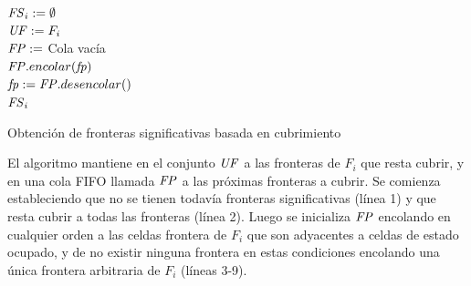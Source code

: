 \begin{algorithm}[H]
\SetAlgoLined

  $\mathit{FS}_i := \emptyset$\\
  $\mathit{UF} := F_i$ \\

  $\mathit{FP} :=$ Cola vacía \\
   {
    $\mathit{FP}.encolar(\mathit{fp})$\\
  }
   {
    $\mathit{fp} := \mathit{FP}.desencolar()$\\
  }
  \Return $\mathit{FS}_i$ 

  \caption{Obtención de fronteras significativas basada en cubrimiento}
  \label{alg:IdObjGeo}
\end{algorithm}


El algoritmo mantiene en el conjunto $\mathit{UF}$ a las fronteras de $F_i$ que
resta cubrir, y en una cola FIFO llamada $\mathit{FP}$ a las próximas fronteras a
cubrir. Se comienza estableciendo que no se tienen todavía fronteras
significativas (línea 1) y  que resta cubrir a todas las fronteras (línea 2).
Luego se inicializa $\mathit{FP}$ encolando en cualquier orden a las celdas
frontera de $F_i$ que son adyacentes a celdas de estado ocupado, y de no
existir ninguna frontera en estas condiciones encolando una única frontera
arbitraria de $F_i$ (líneas 3-9). 

